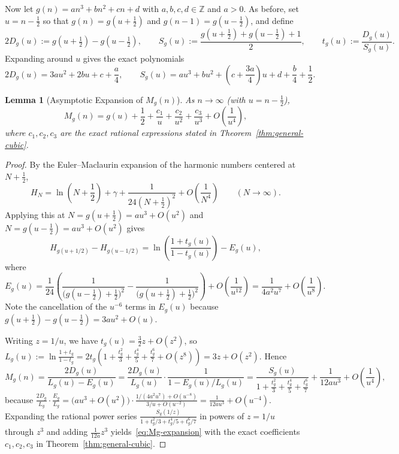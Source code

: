 \documentclass[11pt,a4paper]{article}
\newtheorem{lemma}[theorem]{Lemma}
\theoremstyle{remark}
\begin{document}
Now let $g(n) = an^3 + bn^2 + cn + d$ with $a,b,c,d \in \mathbb{Z}$ and $a > 0$. As before, set $u = n - \frac{1}{2}$ so that $g(n) = g(u + \frac{1}{2})$ and $g(n-1) = g(u - \frac{1}{2})$, and define
\[
  2D_g(u) := g\!\left(u + \tfrac{1}{2}\right) - g\!\left(u - \tfrac{1}{2}\right), \qquad S_g(u) := \frac{g(u + \tfrac{1}{2}) + g(u - \tfrac{1}{2}) + 1}{2}, \qquad t_g(u) := \frac{D_g(u)}{S_g(u)}.
\]
Expanding around $u$ gives the exact polynomials
\[
  2D_g(u) = 3au^2 + 2bu + c + \frac{a}{4}, \qquad S_g(u) = au^3 + bu^2 + \left(c + \frac{3a}{4}\right)u + d + \frac{b}{4} + \frac{1}{2}.
\]

\begin{lemma}[Asymptotic Expansion of $M_g(n)$]\label{lem:asymptotic}
As $n \to \infty$ (with $u = n - \frac{1}{2}$),
\begin{equation}\label{eq:Mg-expansion}
  M_g(n) = g(u) + \frac{1}{2} + \frac{c_1}{u} + \frac{c_2}{u^2} + \frac{c_3}{u^3} + O\!\left(\frac{1}{u^4}\right),
\end{equation}
where $c_1, c_2, c_3$ are the exact rational expressions stated in Theorem~\ref{thm:general-cubic}.
\end{lemma}

\begin{proof}
By the Euler--Maclaurin expansion of the harmonic numbers centered at $N + \frac{1}{2}$,
\[
  H_N = \ln\!\left(N + \frac{1}{2}\right) + \gamma + \frac{1}{24(N + \frac{1}{2})^2} + O\!\left(\frac{1}{N^4}\right) \qquad (N \to \infty).
\]
Applying this at $N = g(u + \frac{1}{2}) = au^3 + O(u^2)$ and $N = g(u - \frac{1}{2}) = au^3 + O(u^2)$ gives
\[
  H_{g(u+1/2)} - H_{g(u-1/2)} = \ln\!\left(\frac{1 + t_g(u)}{1 - t_g(u)}\right) - E_g(u),
\]
where
\[
  E_g(u) = \frac{1}{24}\!\left(\frac{1}{\big(g(u-\frac{1}{2}) + \frac{1}{2}\big)^2} - \frac{1}{\big(g(u+\frac{1}{2}) + \frac{1}{2}\big)^2}\right) + O\!\left(\frac{1}{u^{12}}\right) = \frac{1}{4a^2 u^7} + O\!\left(\frac{1}{u^8}\right).
\]
Note the cancellation of the $u^{-6}$ terms in $E_g(u)$ because $g(u+\frac{1}{2}) - g(u-\frac{1}{2}) = 3au^2 + O(u)$.

Writing $z = 1/u$, we have $t_g(u) = \frac{3}{2}z + O(z^2)$, so $L_g(u) := \ln\frac{1+t_g}{1-t_g} = 2t_g(1 + \frac{t_g^2}{3} + \frac{t_g^4}{5} + \frac{t_g^6}{7} + O(z^8)) = 3z + O(z^2)$. Hence
\[
  M_g(n) = \frac{2D_g(u)}{L_g(u) - E_g(u)} = \frac{2D_g(u)}{L_g(u)} \cdot \frac{1}{1 - E_g(u)/L_g(u)} = \frac{S_g(u)}{1 + \frac{t_g^2}{3} + \frac{t_g^4}{5} + \frac{t_g^6}{7}} + \frac{1}{12a u^3} + O\!\left(\frac{1}{u^4}\right),
\]
because $\frac{2D_g}{L_g} \cdot \frac{E_g}{L_g} = \big(au^3 + O(u^2)\big)\cdot \frac{1/(4a^2 u^7) + O(u^{-8})}{3/u + O(u^{-2})} = \frac{1}{12a u^3} + O(u^{-4})$. Expanding the rational power series $\frac{S_g(1/z)}{1 + t_g^2/3 + t_g^4/5 + t_g^6/7}$ in powers of $z = 1/u$ through $z^3$ and adding $\frac{1}{12a}z^3$ yields~\eqref{eq:Mg-expansion} with the exact coefficients $c_1, c_2, c_3$ in Theorem~\ref{thm:general-cubic}.
\end{proof}
\end{document}
